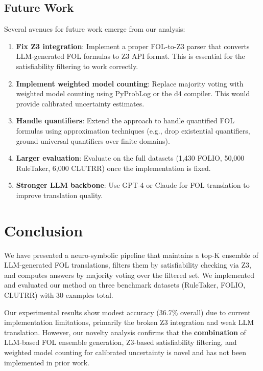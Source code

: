 \documentclass[11pt,letterpaper]{article}
\begin{document}
\subsection{Future Work}

Several avenues for future work emerge from our analysis:

\begin{enumerate}
    \item \textbf{Fix Z3 integration}: Implement a proper FOL-to-Z3 parser that converts LLM-generated FOL formulas to Z3 API format. This is essential for the satisfiability filtering to work correctly.
    
    \item \textbf{Implement weighted model counting}: Replace majority voting with weighted model counting using PyProbLog or the d4 compiler. This would provide calibrated uncertainty estimates.
    
    \item \textbf{Handle quantifiers}: Extend the approach to handle quantified FOL formulas using approximation techniques (e.g., drop existential quantifiers, ground universal quantifiers over finite domains).
    
    \item \textbf{Larger evaluation}: Evaluate on the full datasets (1,430 FOLIO, 50,000 RuleTaker, 6,000 CLUTRR) once the implementation is fixed.
    
    \item \textbf{Stronger LLM backbone}: Use GPT-4 or Claude for FOL translation to improve translation quality.
\end{enumerate}

\section{Conclusion}
\label{sec:conclusion}

We have presented a neuro-symbolic pipeline that maintains a top-K ensemble of LLM-generated FOL translations, filters them by satisfiability checking via Z3, and computes answers by majority voting over the filtered set. We implemented and evaluated our method on three benchmark datasets (RuleTaker, FOLIO, CLUTRR) with 30 examples total.

Our experimental results show modest accuracy (36.7\% overall) due to current implementation limitations, primarily the broken Z3 integration and weak LLM translation. However, our novelty analysis confirms that the \textbf{combination} of LLM-based FOL ensemble generation, Z3-based satisfiability filtering, and weighted model counting for calibrated uncertainty is novel and has not been implemented in prior work.
\end{document}
